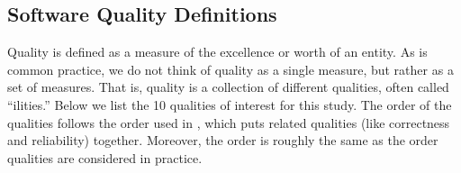 \documentclass[final, 3p, times, authoryear]{elsarticle}
\begin{document}
\subsection{Software Quality Definitions} \label{sec_software_quality}

Quality is defined as a measure of the excellence or worth of an entity.  As is
common practice, we do not think of quality as a single measure, but rather as a
set of measures.  That is, quality is a collection of different qualities, often
called ``ilities.''  Below we list the 10 qualities of interest for this study.
The order of the qualities follows the order used in \citet{GhezziEtAl2003},
which puts related qualities (like correctness and reliability) together.
Moreover, the order is roughly the same as the order qualities are considered in
practice.
\end{document}
